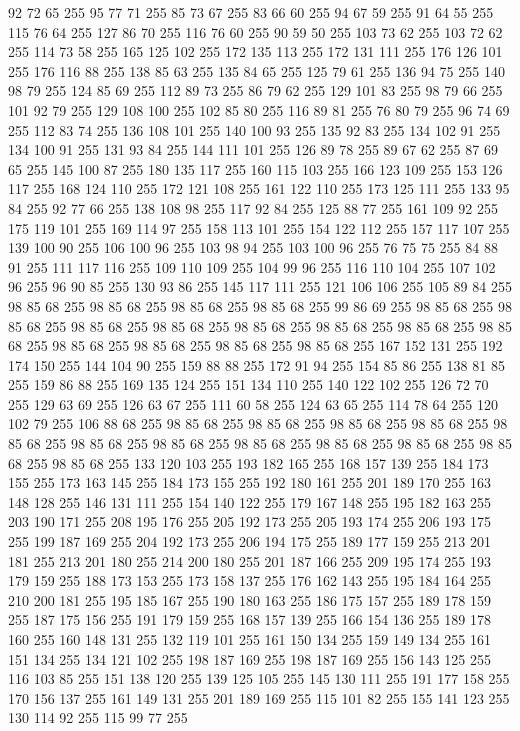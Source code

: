 92 72 65 255 95 77 71 255 85 73 67 255 83 66 60 255 94 67 59 255 91 64 55 255 115 76 64 255 127 86 70 255 116 76 60 255 90 59 50 255 103 73 62 255 103 72 62 255 114 73 58 255 165 125 102 255 172 135 113 255 172 131 111 255 176 126 101 255 176 116 88 255 138 85 63 255 135 84 65 255 125 79 61 255 136 94 75 255 140 98 79 255 124 85 69 255 112 89 73 255 86 79 62 255 129 101 83 255 98 79 66 255 101 92 79 255 129 108 100 255 102 85 80 255 116 89 81 255 76 80 79 255 96 74 69 255 112 83 74 255 136 108 101 255 140 100 93 255 135 92 83 255 134 102 91 255 134 100 91 255 131 93 84 255 144 111 101 255 126 89 78 255 89 67 62 255 87 69 65 255 145 100 87 255 180 135 117 255 160 115 103 255 166 123 109 255 153 126 117 255 168 124 110 255 172 121 108 255 161 122 110 255 173 125 111 255 133 95 84 255 92 77 66 255 138 108 98 255 117 92 84 255 125 88 77 255 161 109 92 255 175 119 101 255 169 114 97 255 158 113 101 255 154 122 112 255
157 117 107 255 139 100 90 255 106 100 96 255 103 98 94 255 103 100 96 255 76 75 75 255 84 88 91 255 111 117 116 255 109 110 109 255 104 99 96 255 116 110 104 255 107 102 96 255 96 90 85 255 130 93 86 255 145 117 111 255 121 106 106 255 105 89 84 255 98 85 68 255 98 85 68 255 98 85 68 255 98 85 68 255 99 86 69 255 98 85 68 255 98 85 68 255 98 85 68 255 98 85 68 255 98 85 68 255 98 85 68 255 98 85 68 255 98 85 68 255 98 85 68 255 98 85 68 255 98 85 68 255 98 85 68 255 167 152 131 255 192 174 150 255 144 104 90 255 159 88 88 255 172 91 94 255 154 85 86 255 138 81 85 255 159 86 88 255 169 135 124 255 151 134 110 255 140 122 102 255 126 72 70 255 129 63 69 255 126 63 67 255 111 60 58 255 124 63 65 255 114 78 64 255 120 102 79 255 106 88 68 255 98 85 68 255 98 85 68 255 98 85 68 255 98 85 68 255 98 85 68 255 98 85 68 255 98 85 68 255 98 85 68 255 98 85 68 255 98 85 68 255 98 85 68 255
98 85 68 255 133 120 103 255 193 182 165 255 168 157 139 255 184 173 155 255 173 163 145 255 184 173 155 255 192 180 161 255 201 189 170 255 163 148 128 255 146 131 111 255 154 140 122 255 179 167 148 255 195 182 163 255 203 190 171 255 208 195 176 255 205 192 173 255 205 193 174 255 206 193 175 255 199 187 169 255 204 192 173 255 206 194 175 255 189 177 159 255 213 201 181 255 213 201 180 255 214 200 180 255 201 187 166 255 209 195 174 255 193 179 159 255 188 173 153 255 173 158 137 255 176 162 143 255 195 184 164 255 210 200 181 255 195 185 167 255 190 180 163 255 186 175 157 255 189 178 159 255 187 175 156 255 191 179 159 255 168 157 139 255 166 154 136 255 189 178 160 255 160 148 131 255 132 119 101 255 161 150 134 255 159 149 134 255 161 151 134 255 134 121 102 255 198 187 169 255 198 187 169 255 156 143 125 255 116 103 85 255 151 138 120 255 139 125 105 255 145 130 111 255 191 177 158 255 170 156 137 255 161 149 131 255 201 189 169 255 115 101 82 255 155 141 123 255 130 114 92 255 115 99 77 255

